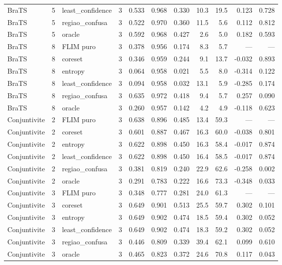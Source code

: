 \begin{tabular}{lllrrrrrrrr}
BraTS & 5 & least\_confidence & 3 & 0.533 & 0.968 & 0.330 & 10.3 & 19.5 & 0.123 & 0.728 \\
BraTS & 5 & regiao\_confusa & 3 & 0.522 & 0.970 & 0.360 & 11.5 & 5.6 & 0.112 & 0.812 \\
BraTS & 5 & oracle & 3 & 0.592 & 0.968 & 0.427 & 2.6 & 5.0 & 0.182 & 0.593 \\
BraTS & 8 & FLIM puro & 3 & 0.378 & 0.956 & 0.174 & 8.3 & 5.7 & --- & --- \\
BraTS & 8 & coreset & 3 & 0.346 & 0.959 & 0.244 & 9.1 & 13.7 & -0.032 & 0.893 \\
BraTS & 8 & entropy & 3 & 0.064 & 0.958 & 0.021 & 5.5 & 8.0 & -0.314 & 0.122 \\
BraTS & 8 & least\_confidence & 3 & 0.094 & 0.958 & 0.032 & 13.1 & 5.9 & -0.285 & 0.174 \\
BraTS & 8 & regiao\_confusa & 3 & 0.635 & 0.972 & 0.418 & 9.4 & 5.7 & 0.257 & 0.090 \\
BraTS & 8 & oracle & 3 & 0.260 & 0.957 & 0.142 & 4.2 & 4.9 & -0.118 & 0.623 \\
Conjuntivite & 2 & FLIM puro & 3 & 0.638 & 0.896 & 0.485 & 13.4 & 59.3 & --- & --- \\
Conjuntivite & 2 & coreset & 3 & 0.601 & 0.887 & 0.467 & 16.3 & 60.0 & -0.038 & 0.801 \\
Conjuntivite & 2 & entropy & 3 & 0.622 & 0.898 & 0.450 & 16.3 & 58.4 & -0.017 & 0.874 \\
Conjuntivite & 2 & least\_confidence & 3 & 0.622 & 0.898 & 0.450 & 16.4 & 58.5 & -0.017 & 0.874 \\
Conjuntivite & 2 & regiao\_confusa & 3 & 0.381 & 0.819 & 0.240 & 22.9 & 62.6 & -0.258 & 0.002 \\
Conjuntivite & 2 & oracle & 3 & 0.291 & 0.783 & 0.222 & 16.6 & 73.3 & -0.348 & 0.033 \\
Conjuntivite & 3 & FLIM puro & 3 & 0.348 & 0.777 & 0.281 & 24.0 & 61.3 & --- & --- \\
Conjuntivite & 3 & coreset & 3 & 0.649 & 0.901 & 0.513 & 25.5 & 59.7 & 0.302 & 0.101 \\
Conjuntivite & 3 & entropy & 3 & 0.649 & 0.902 & 0.474 & 18.5 & 59.4 & 0.302 & 0.052 \\
Conjuntivite & 3 & least\_confidence & 3 & 0.649 & 0.902 & 0.474 & 18.3 & 59.2 & 0.302 & 0.052 \\
Conjuntivite & 3 & regiao\_confusa & 3 & 0.446 & 0.809 & 0.339 & 39.4 & 62.1 & 0.099 & 0.610 \\
Conjuntivite & 3 & oracle & 3 & 0.465 & 0.823 & 0.372 & 24.6 & 70.8 & 0.117 & 0.043 \\

\end{tabular}
